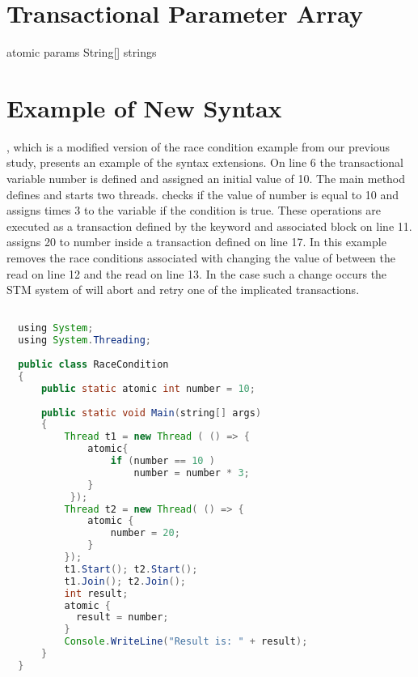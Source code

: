 \section{Transactional Parameter Array}
atomic params String[] strings
\cite[p. 17]{csharp2013specificaiton}
\section{Example of New Syntax}\label{sec:example_design}
, which is a modified version of the race condition example from our previous study\cite[p. 23]{dpt907e14trending}, presents an example of the syntax extensions. On line 6 the transactional variable number is defined and assigned an initial value of 10. The main method defines and starts two threads.  checks if the value of number is equal to 10 and assigns  times 3 to the variable if the condition is true. These operations are executed as a transaction defined by the  keyword and associated block on line 11.  assigns 20 to number inside a transaction defined on line 17. In this example \stmnamesp removes the race conditions associated with  changing the value of  between the read on line 12 and the read on line 13. In the case such a change occurs the \ac{STM} system of \stmnamesp will abort and retry one of the implicated transactions.
 
\begin{lstlisting}[label=lst:stm_atomic_syntax,
  caption={Transaction Syntax},
  language=Java,  
  showspaces=false,
  showtabs=false,
  breaklines=true,
  showstringspaces=false,
  breakatwhitespace=true,
  commentstyle=\color{greencomments},
  keywordstyle=\color{bluekeywords},
  stringstyle=\color{redstrings},
  morekeywords={atomic, retry, orElse, var, get, set, using}]  % Start your code-block

  using System;
  using System.Threading;
  
  public class RaceCondition
  {
      public static atomic int number = 10;
  
      public static void Main(string[] args)
      {
          Thread t1 = new Thread ( () => {
              atomic{
                  if (number == 10 )           
                      number = number * 3;
              }
           });
          Thread t2 = new Thread( () => {
              atomic {
                  number = 20;
              }
          });
          t1.Start(); t2.Start();
          t1.Join(); t2.Join();
          int result;
          atomic {
            result = number;          
          }
          Console.WriteLine("Result is: " + result);
      }
  }
\end{lstlisting}

